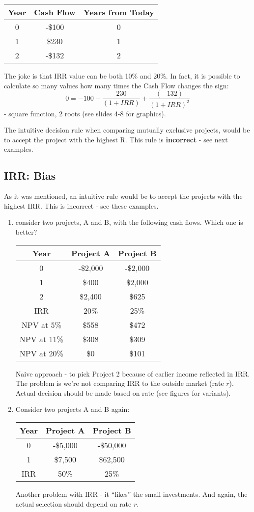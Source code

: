 \documentclass{scrartcl}
\begin{document}
\begin{tabular}{c|c|c}
  Year & Cash Flow & Years from Today \\
  \hline
  0 & -\$100 & 0  \\
  1 & \$230 & 1 \\
  2 & -\$132 & 2 \\
\end{tabular}

The joke is that IRR value can be both 10\% and 20\%. In fact, it is possible to
calculate so many values how many times the Cash Flow changes the sign:$$0=-100
+ \frac{230}{(1+IRR)} + \frac{(-132)}{(1+IRR)^2}$$ - square function, 2 roots
(see slides 4-8 for graphics).

The intuitive decision rule when comparing mutually exclusive projects, would be
to accept the project with the highest R. This rule is {\bf incorrect} - see
next examples.

\subsection{IRR: Bias}
\label{sec:IRR:bias}

As it was mentioned, an intuitive rule would be to accept the projects with the
highest IRR. This is incorrect - see these examples.

\begin{enumerate}
\item consider two projects, A and B, with the following cash flows. Which one
  is better?
\begin{tabular}{|c|c|c|}
  Year & Project A & Project B \\
  \hline
  0 & -\$2,000 & -\$2,000 \\
  1 & \$400 & \$2,000 \\
  2 & \$2,400 & \$625 \\
\hline
IRR & 20\%  & 25\% \\
NPV at 5\% & \$558  & \$472  \\
NPV at 11\% & \$308    & \$309  \\
NPV at 20\% & \$0   & \$101  \\
\end{tabular}

Naive approach - to pick Project 2 because of earlier income reflected in IRR.
The problem is we're not comparing IRR to the outside market (rate $r$). Actual
decision should be made based on rate (see figures for variants).

\item Consider two projects A and B again:
\begin{tabular}{|c|c|c|}
  Year & Project A & Project B \\
  \hline
  0 & -\$5,000 & -\$50,000 \\
  1 & \$7,500 & \$62,500 \\
\hline
IRR & 50\%  & 25\% \\
\end{tabular}

Another problem with IRR - it ``likes'' the small investments. And again, the
actual selection should depend on rate $r$.
\end{enumerate}
\end{document}
